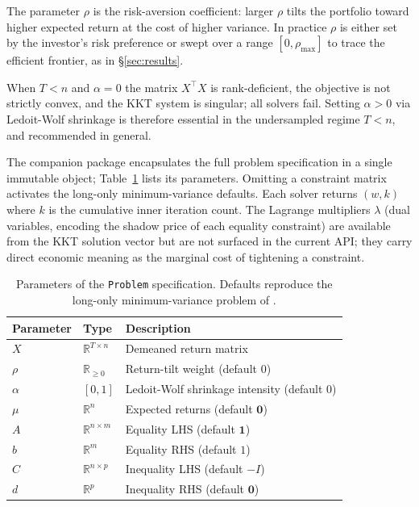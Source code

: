 \documentclass{siam/siamart}
\begin{document}
\begin{remark}
The parameter $\rho$ is the risk-aversion coefficient: larger $\rho$ tilts
the portfolio toward higher expected return at the cost of higher variance.  In
practice $\rho$ is either set by the investor's risk preference or swept over a range
$[0, \rho_{\max}]$ to trace the efficient frontier, as in \S\ref{sec:results}.
\end{remark}

\begin{remark}
When $T < n$ and $\alpha = 0$ the matrix $X^\top X$ is rank-deficient, the objective
is not strictly convex, and the KKT system is singular; all solvers fail.  Setting
$\alpha > 0$ via Ledoit-Wolf shrinkage is therefore essential in the undersampled
regime $T < n$, and recommended in general.
\end{remark}

The companion package \cite{fast_minimum_variance} encapsulates the full
problem specification in a single immutable object; Table~\ref{tab:params}
lists its parameters.  Omitting a constraint matrix activates the long-only
minimum-variance defaults.  Each solver returns $(w, k)$ where $k$ is the
cumulative inner iteration count.  The Lagrange multipliers $\lambda$ (dual
variables, encoding the shadow price of each equality constraint) are available
from the KKT solution vector but are not surfaced in the current API; they
carry direct economic meaning as the marginal cost of tightening a constraint.

\begin{table}[ht]
\centering
\begin{tabular}{lll}
\toprule
Parameter & Type & Description \\
\midrule
$X$       & $\mathbb{R}^{T \times n}$ & Demeaned return matrix \\
$\rho$    & $\mathbb{R}_{\geq 0}$     & Return-tilt weight (default $0$) \\
$\alpha$  & $[0,1]$                   & Ledoit-Wolf shrinkage intensity (default $0$) \\
$\mu$     & $\mathbb{R}^n$            & Expected returns (default $\mathbf{0}$) \\
$A$       & $\mathbb{R}^{n \times m}$ & Equality LHS (default $\mathbf{1}$) \\
$b$       & $\mathbb{R}^m$            & Equality RHS (default $1$) \\
$C$       & $\mathbb{R}^{n \times p}$ & Inequality LHS (default $-I$) \\
$d$       & $\mathbb{R}^p$            & Inequality RHS (default $\mathbf{0}$) \\
\bottomrule
\end{tabular}
\caption{Parameters of the \texttt{Problem} specification.  Defaults reproduce
the long-only minimum-variance problem of \cite{minvar_paper}.}
\label{tab:params}
\end{table}
\end{document}
